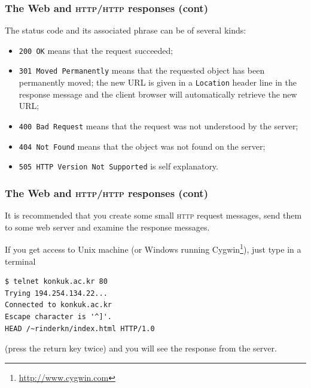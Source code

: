 %
\begin{frame}[containsverbatim]
\frametitle{The Web and \textsc{http}/\textsc{http} responses (cont)}

The status code and its associated phrase can be of several kinds:
\begin{itemize}

  \item \verb+200 OK+ means that the request succeeded;

  \item \verb+301 Moved Permanently+ means that the requested object
  has been permanently moved; the new URL is given in a
  \verb+Location+ header line in the response message and the client
  browser will automatically retrieve the new URL;

  \item \verb+400 Bad Request+ means that the request was not
  understood by the server;

  \item \verb+404 Not Found+ means that the object was not found on
  the server;

  \item \verb+505 HTTP Version Not Supported+ is self explanatory.

\end{itemize}

\end{frame}

%
\begin{frame}[containsverbatim]
\frametitle{The Web and \textsc{http}/\textsc{http} responses (cont)}

It is recommended that you create some small \textsc{http} request
messages, send them to some web server and examine the response messages.

\bigskip

If you get access to Unix machine (or Windows running
\textsf{Cygwin}\footnote{\url{http://www.cygwin.com}}), just type in a
terminal
{\small
\begin{verbatim}
$ telnet konkuk.ac.kr 80
Trying 194.254.134.22...
Connected to konkuk.ac.kr
Escape character is '^]'.
HEAD /~rinderkn/index.html HTTP/1.0
\end{verbatim}
}
(press the return key twice) and you will see the response from the
server.

\end{frame}

